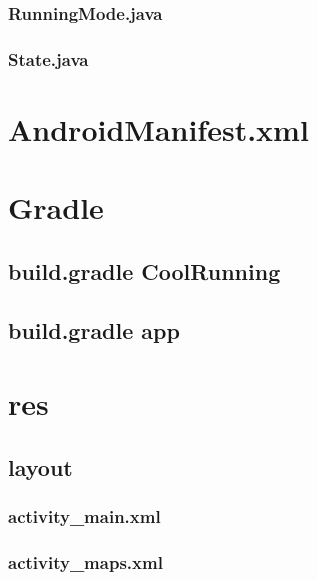 \documentclass[11pt, titlepage ]{article}
\begin{document}
\subsubsection{RunningMode.java}

\subsubsection{State.java}


\clearpage

\section{AndroidManifest.xml}


\section{Gradle}
\subsection{build.gradle CoolRunning}

\subsection{build.gradle app}



\clearpage

\section{res}
\subsection{layout}
\subsubsection{activity\_main.xml}

\subsubsection{activity\_maps.xml}

\end{document}
